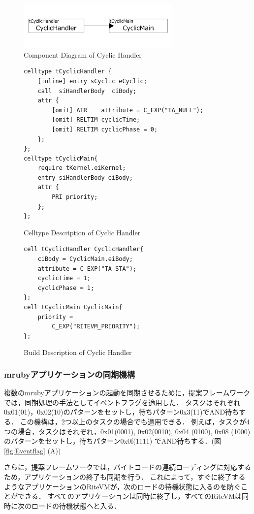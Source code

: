 \documentclass[submit]{ipsj_v2/UTF8/ipsj}
\begin{document}
\begin{figure}[t]
    \centering
    \includegraphics[width=8cm,clip]{../EMSOFT2016/figure/cyclic_handler.pdf}
    \caption{Component Diagram of Cyclic Handler}
    \label{fig:cyclic_handler}
\end{figure}
\begin{figure}[t]
    \centering
    \begin{lstlisting}
celltype tCyclicHandler {
    [inline] entry sCyclic eCyclic;
    call  siHandlerBody  ciBody;
    attr {
    	[omit] ATR    attribute = C_EXP("TA_NULL");
    	[omit] RELTIM cyclicTime;
    	[omit] RELTIM cyclicPhase = 0;
    };
};
celltype tCyclicMain{
    require tKernel.eiKernel;
    entry siHandlerBody eiBody;
    attr {
        PRI priority;
    };
};
    \end{lstlisting}
    \caption{Celltype Description of Cyclic Handler}
    \label{celltype_cyclic_handler}
\end{figure}
\begin{figure}[t]
    \centering
    \begin{lstlisting}
cell tCyclicHandler CyclicHandler{
    ciBody = CyclicMain.eiBody;
    attribute = C_EXP("TA_STA");
    cyclicTime = 1;
    cyclicPhase = 1;
};
cell tCyclicMain CyclicMain{
    priority =
        C_EXP("RITEVM_PRIORITY");
};
   \end{lstlisting}
    \caption{Build Description of Cyclic Handler}
    \label{build_cyclic_handler}
\end{figure}
 
\subsubsection{mrubyアプリケーションの同期機構}
複数のmrubyアプリケーションの起動を同期させるために，提案フレームワークでは，同期処理の手法としてイベントフラグを適用した．
タスクはそれぞれ0x01(01)，0x02(10)のパターンをセットし，待ちパターン0x3(11)でAND待ちする．
この機構は，2つ以上のタスクの場合でも適用できる．
例えば，タスクが4つの場合，タスクはそれぞれ，0x01(0001), 0x02(0010), 0x04 (0100), 0x08 (1000)のパターンをセットし，待ちパターン0x0f(1111) でAND待ちする．(図\ref{fig:Eventflag} (A))

さらに，提案フレームワークでは，バイトコードの連続ローディングに対応するため，アプリケーションの終了も同期を行う．
これによって，すぐに終了するようなアプリケーションのRiteVMが，次のロードの待機状態に入るのを防ぐことができる．
すべてのアプリケーションは同時に終了し，すべてのRiteVMは同時に次のロードの待機状態へと入る．
\end{document}
